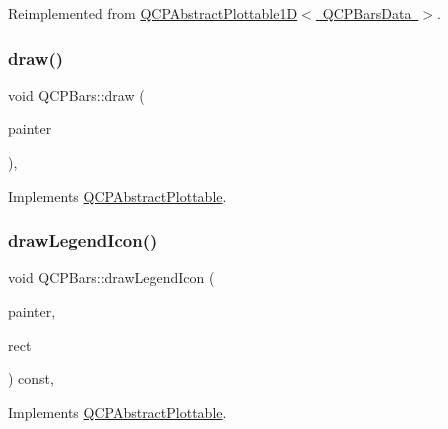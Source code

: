 Reimplemented from \mbox{\hyperlink{class_q_c_p_abstract_plottable1_d_a6ca0699a6af5f25a7565de7c50ce13b2}{Q\+C\+P\+Abstract\+Plottable1\+D$<$ Q\+C\+P\+Bars\+Data $>$}}.

\mbox{\label{class_q_c_p_bars_aa267c20650d55084c3f47cb2f8fac9dc}} 
\subsubsection{\texorpdfstring{draw()}{draw()}}
{\footnotesize\ttfamily void Q\+C\+P\+Bars\+::draw (\begin{DoxyParamCaption}\item[{\mbox{\hyperlink{class_q_c_p_painter}{Q\+C\+P\+Painter}} $\ast$}]{painter }\end{DoxyParamCaption})\hspace{0.3cm}{\ttfamily [protected]}, {\ttfamily [virtual]}}



Implements \mbox{\hyperlink{class_q_c_p_abstract_plottable_a453f676a5cee7bf846c5f0fa05ea84b3}{Q\+C\+P\+Abstract\+Plottable}}.

\mbox{\label{class_q_c_p_bars_aee7c3e1763fd6b504c45baa8775be7b7}} 
\subsubsection{\texorpdfstring{drawLegendIcon()}{drawLegendIcon()}}
{\footnotesize\ttfamily void Q\+C\+P\+Bars\+::draw\+Legend\+Icon (\begin{DoxyParamCaption}\item[{\mbox{\hyperlink{class_q_c_p_painter}{Q\+C\+P\+Painter}} $\ast$}]{painter,  }\item[{const Q\+RectF \&}]{rect }\end{DoxyParamCaption}) const\hspace{0.3cm}{\ttfamily [protected]}, {\ttfamily [virtual]}}



Implements \mbox{\hyperlink{class_q_c_p_abstract_plottable_a9a450783fd9ed539e589999fd390cdf7}{Q\+C\+P\+Abstract\+Plottable}}.

\mbox{\label{class_q_c_p_bars_a01b87e38e5d5089d214646d2af7896ea}} 
